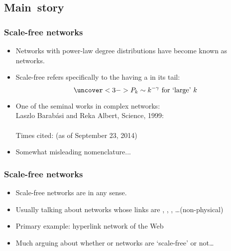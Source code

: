 \subsection{Main\ story}

\begin{frame}[label=]
 \frametitle{Scale-free networks}
 
 \begin{block}{}
 \begin{itemize}
 \item<1-> 
   Networks with power-law degree distributions
   have become known as  networks.
 \item<2->
   Scale-free refers specifically to the 
   having a  in its tail:
   $$
   \uncover<3->{
     P_k \sim k^{-\gamma} 
     \mbox{\ for `large' $k$}
   }
   $$
 \item<4->
   One of the seminal works in complex networks:\\
   Laszlo Barab\'{a}si and Reka Albert, Science, 1999:\\
   \cite{barabasi1999a}\\
   {Times cited: }
   {\tiny(as of September 23, 2014)}
 \item<5->
   Somewhat misleading nomenclature...
 \end{itemize}
 \end{block}

\end{frame}

\begin{frame}[label=]
  \frametitle{Scale-free networks}

  \begin{block}{}
  \begin{itemize}
  \item<1->
    Scale-free networks are  in any sense.
  \item<2->
    Usually talking about networks whose links are
    , 
    , 
    , 
    \ldots (non-physical)
  \item<3->
    Primary example: hyperlink network of the Web
  \item<4->
    Much arguing about whether or networks are `scale-free' or not\ldots
  \end{itemize}
  \end{block}

\end{frame}

